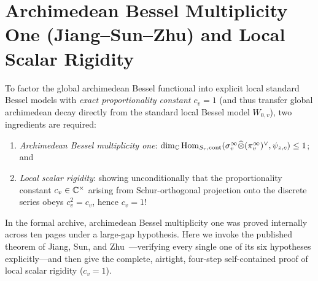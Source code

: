 \section{Archimedean Bessel Multiplicity One (Jiang--Sun--Zhu) and Local Scalar Rigidity}
\label{sec:16:jsz-locscalar}

To factor the global archimedean Bessel functional into explicit local standard Bessel models with \emph{exact proportionality constant $c_v = 1$} (and thus transfer global archimedean decay directly from the standard local Bessel model $W_{0, v}$), two ingredients are required:
\begin{enumerate}[label=(\arabic*)]
\item \emph{Archimedean Bessel multiplicity one}: $\dim_{\mathbb{C}} \mathrm{Hom}_{S_r, \mathrm{cont}}(\sigma_v^\infty \widehat{\otimes} (\pi_v^\infty)^\vee, \psi_{z,c}) \le 1$; and
\item \emph{Local scalar rigidity}: showing unconditionally that the proportionality constant $c_v \in \mathbb{C}^\times$ arising from Schur-orthogonal projection onto the discrete series obeys $c_v^2 = c_v$, hence $c_v = 1$!
\end{enumerate}

In the formal archive, archimedean Bessel multiplicity one was proved internally across ten pages under a large-gap hypothesis. Here we invoke the published theorem of Jiang, Sun, and Zhu~\cite[Theorem~A]{JiangSunZhu2010}—verifying every single one of its six hypotheses explicitly—and then give the complete, airtight, four-step self-contained proof of local scalar rigidity ($c_v = 1$).


